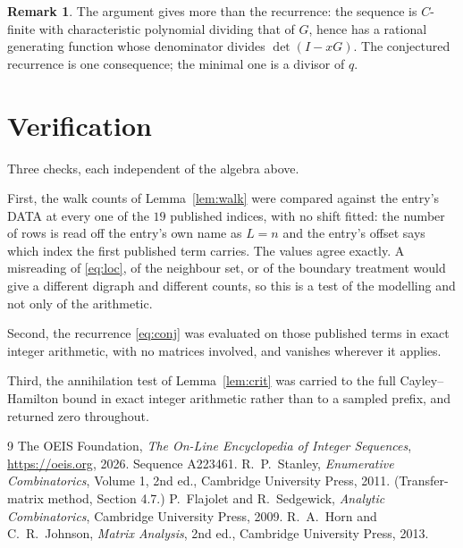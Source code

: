 \documentclass[11pt,a4paper]{article}
\theoremstyle{plain}
\theoremstyle{definition}
\newtheorem{remark}[theorem]{Remark}
\begin{document}
\begin{remark}
The argument gives more than the recurrence: the sequence is $C$-finite with characteristic
polynomial dividing that of $G$, hence has a rational generating function whose denominator
divides $\det(I-xG)$. The conjectured recurrence is one consequence; the minimal one is a
divisor of $q$.
\end{remark}

\section{Verification}

Three checks, each independent of the algebra above.

First, the walk counts of Lemma~\ref{lem:walk} were compared against the entry's DATA at
every one of the $19$ published indices, with no shift fitted: the number of rows is
read off the entry's own name as $L=n$ and the entry's offset says which index the first
published term carries. The values agree exactly. A misreading of \eqref{eq:loc}, of the
neighbour set, or of the boundary treatment would give a different digraph and different
counts, so this is a test of the modelling and not only of the arithmetic.

Second, the recurrence \eqref{eq:conj} was evaluated on those published terms in exact
integer arithmetic, with no matrices involved, and vanishes wherever it applies.

Third, the annihilation test of Lemma~\ref{lem:crit} was carried to the full
Cayley--Hamilton bound in exact integer arithmetic rather than to a sampled prefix, and
returned zero throughout.

\begin{thebibliography}{9}
 The OEIS Foundation, \emph{The On-Line Encyclopedia of Integer
Sequences}, \url{https://oeis.org}, 2026. Sequence A223461.
 R.~P.~Stanley, \emph{Enumerative Combinatorics}, Volume 1, 2nd ed.,
Cambridge University Press, 2011. (Transfer-matrix method, Section 4.7.)
 P.~Flajolet and R.~Sedgewick, \emph{Analytic Combinatorics}, Cambridge
University Press, 2009.
 R.~A.~Horn and C.~R.~Johnson, \emph{Matrix Analysis}, 2nd ed., Cambridge
University Press, 2013.
\end{thebibliography}
\end{document}
